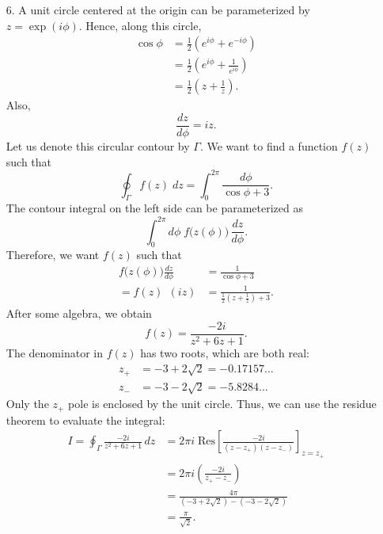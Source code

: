 \documentclass[10pt,a4paper]{article}
\begin{document}
\begin{enumerate}
\item[6.]
A unit circle centered at the origin can be parameterized by $z =
\exp(i\phi)$. Hence, along this circle,
\begin{align}
  \cos\phi &= \frac{1}{2}\left(e^{i\phi} + e^{-i\phi}\right) \\
  &= \frac{1}{2} \left(e^{i\phi} + \frac{1}{e^{i\phi}}\right) \\
  &= \frac{1}{2}\left(z + \frac{1}{z}\right).
\end{align}
Also,
\begin{equation}
  \frac{dz}{d\phi} = iz.
\end{equation}
Let us denote this circular contour by $\Gamma$. We want to find a
function $f(z)$ such that
\begin{equation}
  \oint_\Gamma f(z) \;dz = \int_0^{2\pi} \frac{d\phi}{\cos\phi+3}.
\end{equation}
The contour integral on the left side can be parameterized as
\begin{equation}
  \int_0^{2\pi} d\phi\; f\big(z(\phi)\big)\, \frac{dz}{d\phi}.
\end{equation}
Therefore, we want $f(z)$ such that
\begin{align}
  f\big(z(\phi)\big) \frac{dz}{d\phi} &= \frac{1}{\cos\phi+3} \\
  = f(z) \;\,(i z) &= \frac{1}{\frac{1}{2}\left(z+\frac{1}{z}\right) + 3}.
\end{align}
After some algebra, we obtain
\begin{equation}
  f(z) = \frac{-2i}{z^2 + 6z + 1}.
\end{equation}
The denominator in $f(z)$ has two roots, which are both real:
\begin{align}
  z_+ &= -3 + 2\sqrt{2} = - 0.17157\dots \\
  z_- &= -3 - 2\sqrt{2} = -5.8284\dots
\end{align}
Only the $z_+$ pole is enclosed by the unit circle. Thus, we can use
the residue theorem to evaluate the integral:
\begin{align}
  I = \oint_\Gamma \frac{-2i}{z^2 + 6z + 1} \, dz &= 2\pi i \;
  \mathrm{Res}\left[\frac{-2i}{(z-z_+)(z-z_-)}\right]_{z = z_+} \\
  &= 2\pi i \left(\frac{-2i}{z_+-z_-}\right) \\
  &= \frac{4\pi}{\left(-3 + 2\sqrt{2}\right)-\left(-3 - 2\sqrt{2}\right)} \\
  &= \frac{\pi}{\sqrt{2}}.
\end{align}


\end{enumerate}
\end{document}
